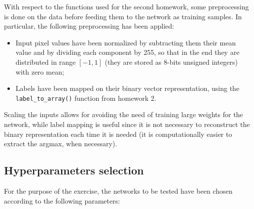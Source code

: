 \documentclass[letterpaper,headings=standardclasses]{scrartcl}
\begin{document}
With respect to the functions used for the second homework, some preprocessing is done on the data before feeding them to the network as training samples. In particular, the following preprocessing has been applied:

\begin{itemize}

    \item Input pixel values have been normalized by subtracting them their mean value and by dividing each component by 255, so that in the end they are distributed in range $[-1,1]$ (they are stored as 8-bits unsigned integers) with zero mean;
    
    \item Labels have been mapped on their binary vector representation, using the \texttt{label\_to\_array()} function from homework 2.

\end{itemize}

Scaling the inputs allows for avoiding the need of training large weights for the network, while label mapping is useful since it is not necessary to reconstruct the binary representation each time it is needed (it is computationally easier to extract the argmax, when necessary).

\subsection{Hyperparameters selection}

For the purpose of the exercise, the networks to be tested have been chosen according to the following parameters:
\end{document}
